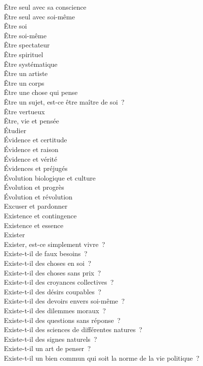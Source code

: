 \documentclass[a4paper,12pt]{article}
\begin{document}
Être seul avec sa conscience \\
Être seul avec soi-même \\
Être soi \\
Être soi-même \\
Être spectateur \\
Être spirituel \\
Être systématique \\
Être un artiste \\
Être un corps \\
Être une chose qui pense \\
Être un sujet, est-ce être maître de soi ? \\
Être vertueux \\
Être, vie et pensée \\
Étudier \\
Évidence et certitude \\
Évidence et raison \\
Évidence et vérité \\
Évidences et préjugés \\
Évolution biologique et culture \\
Évolution et progrès \\
Évolution et révolution \\
Excuser et pardonner \\
Existence et contingence \\
Existence et essence \\
Exister \\
Exister, est-ce simplement vivre ? \\
Existe-t-il de faux besoins ? \\
Existe-t-il des choses en soi ? \\
Existe-t-il des choses sans prix ? \\
Existe-t-il des croyances collectives ? \\
Existe-t-il des désirs coupables ? \\
Existe-t-il des devoirs envers soi-même ? \\
Existe-t-il des dilemmes moraux ? \\
Existe-t-il des questions sans réponse ? \\
Existe-t-il des sciences de différentes natures ? \\
Existe-t-il des signes naturels ? \\
Existe-t-il un art de penser ? \\
Existe-t-il un bien commun qui soit la norme de la vie politique ? \\
\end{document}
